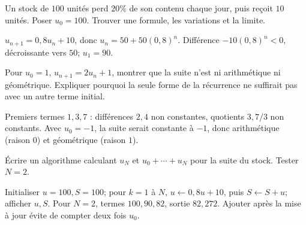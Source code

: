 \exo[Un stock]\label{t11s-c12-e06}
Un stock de $100$ unités perd $20\%$ de son contenu chaque jour, puis reçoit $10$ unités. Poser $u_0=100$. Trouver une formule, les variations et la limite.
\begin{corrige}\label{sol-t11s-c12-e06}
$u_{n+1}=0{,}8u_n+10$, donc $u_n=50+50(0{,}8)^n$. Différence $-10(0{,}8)^n<0$, décroissante vers $50$; $u_1=90$.
\end{corrige}
\label{t11s-c12-e07}
Pour $u_0=1$, $u_{n+1}=2u_n+1$, montrer que la suite n’est ni arithmétique ni géométrique. Expliquer pourquoi la seule forme de la récurrence ne suffirait pas avec un autre terme initial.
\begin{corrige}\label{sol-t11s-c12-e07}
Premiers termes $1,3,7$ : différences $2,4$ non constantes, quotients $3,7/3$ non constants. Avec $u_0=-1$, la suite serait constante à $-1$, donc arithmétique (raison $0$) et géométrique (raison $1$).
\end{corrige}
\label{t11s-c12-e08}
Écrire un algorithme calculant $u_N$ et $u_0+\cdots+u_N$ pour la suite du stock. Tester $N=2$.
\begin{corrige}\label{sol-t11s-c12-e08}
Initialiser $u=100,S=100$; pour $k=1$ à $N$, $u\leftarrow0{,}8u+10$, puis $S\leftarrow S+u$; afficher $u,S$. Pour $N=2$, termes $100,90,82$, sortie $82,272$. Ajouter après la mise à jour évite de compter deux fois $u_0$.
\end{corrige}


